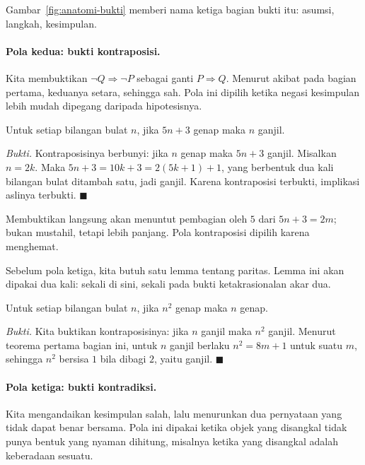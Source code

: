 Gambar~\ref{fig:anatomi-bukti} memberi nama ketiga bagian bukti itu: asumsi, langkah,
kesimpulan.

\paragraph{Pola kedua: bukti kontraposisi.} Kita membuktikan $\neg Q \Rightarrow \neg P$
sebagai ganti $P \Rightarrow Q$. Menurut akibat pada bagian pertama, keduanya setara,
sehingga sah. Pola ini dipilih ketika negasi kesimpulan lebih mudah dipegang daripada
hipotesisnya.

\begin{proposisi}
Untuk setiap bilangan bulat $n$, jika $5n+3$ genap maka $n$ ganjil.
\end{proposisi}
\par\smallskip\noindent\textit{Bukti.} Kontraposisinya berbunyi: jika $n$ genap maka
$5n+3$ ganjil. Misalkan $n = 2k$. Maka $5n+3 = 10k+3 = 2(5k+1)+1$, yang berbentuk dua
kali bilangan bulat ditambah satu, jadi ganjil. Karena kontraposisi terbukti,
implikasi aslinya terbukti.
\hfill$\blacksquare${\parfillskip=0pt\par}

Membuktikan langsung akan menuntut pembagian oleh $5$ dari $5n+3 = 2m$; bukan mustahil,
tetapi lebih panjang. Pola kontraposisi dipilih karena menghemat.

Sebelum pola ketiga, kita butuh satu lemma tentang paritas. Lemma ini akan dipakai dua
kali: sekali di sini, sekali pada bukti ketakrasionalan akar dua.

\begin{lemma}
Untuk setiap bilangan bulat $n$, jika $n^{2}$ genap maka $n$ genap.
\end{lemma}
\par\smallskip\noindent\textit{Bukti.} Kita buktikan kontraposisinya: jika $n$ ganjil
maka $n^{2}$ ganjil. Menurut teorema pertama bagian ini, untuk $n$ ganjil berlaku
$n^{2} = 8m+1$ untuk suatu $m$, sehingga $n^{2}$ bersisa $1$ bila dibagi $2$, yaitu
ganjil.
\hfill$\blacksquare${\parfillskip=0pt\par}

\paragraph{Pola ketiga: bukti kontradiksi.} Kita mengandaikan kesimpulan salah, lalu menurunkan dua pernyataan yang tidak dapat benar
bersama. Pola ini dipakai ketika objek yang disangkal tidak punya bentuk yang nyaman
dihitung, misalnya ketika yang disangkal adalah keberadaan sesuatu.

